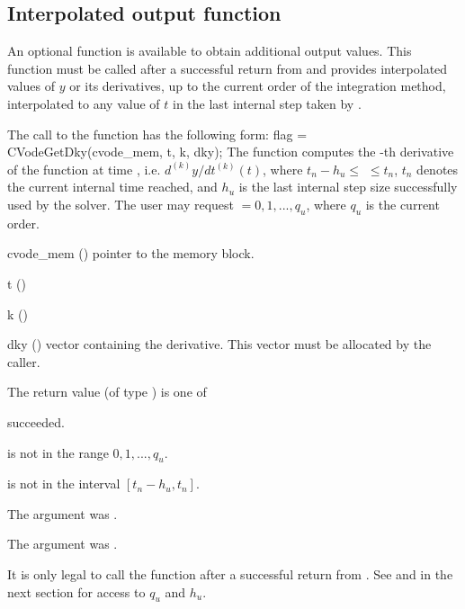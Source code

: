 
\subsection{Interpolated output function}\label{ss:optional_dky}

An optional function  is available to obtain additional output values.  
This function must be called after a successful return from  and provides 
interpolated values of $y$ or its derivatives, up to the current order of the 
integration method, interpolated to any value of $t$ in the last internal step 
taken by {\cvode}.

The call to the  function has the following form:
{
  flag = CVodeGetDky(cvode\_mem, t, k, dky);
}
{
  The function  computes the -th derivative of the  function at      
  time , i.e. $d^{(k)}y/dt^{(k)} (t)$, where $t_n - h_u \le$  $\le t_n$, 
  $t_n$ denotes the current internal time reached, and $h_u$ is the 
  last internal step size successfully used by the solver. 
  The user may request  $= 0, 1, ..., q_u$, where $q_u$ is the 
  current order. 
}
{
  \begin{args}
  \item[cvode\_mem] ()
    pointer to the {\cvode} memory block.
  \item[t] ()
  \item[k] ()
  \item[dky] ()
    vector containing the derivative.
    This vector must be allocated by the caller. 
  \end{args}
}
{
  The return value  (of type ) is one of
  \begin{args} 
  \item[\Id{OKAY}]
     succeeded.
  \item[\Id{BAD\_K}] 
     is not in the range $0, 1, ..., q_u$.
  \item[\Id{BAD\_T}] 
     is not in the interval $[t_n - h_u , t_n]$.
  \item[\Id{BAD\_DKY}] 
    The  argument was .
  \item[\Id{DKY\_NO\_MEM}] 
    The  argument was .
  \end{args}

}
{
  It is only legal to call the function  after a 
  successful return from . See  
  and  in the next section for access to 
  $q_u$ and $h_u$.
}

